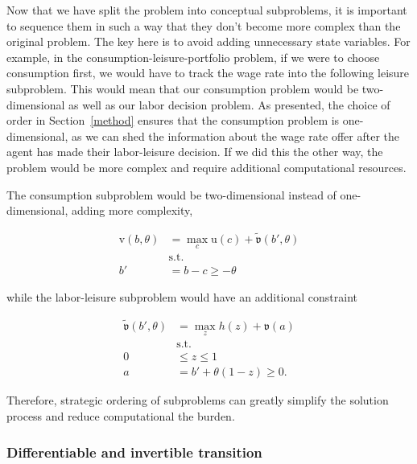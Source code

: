 \documentclass{article}
\newcommand{\tShkEmp}{\theta}
\newcommand{\h}{h}
\newcommand{\bRat}{b}
\newcommand{\leisure}{z}
\newcommand{\cRat}{c}
\newcommand{\vFunc}{\mathrm{v}}
\newcommand{\aRat}{a}
\newcommand{\vOpt}{\tilde{\mathfrak{v}}}
\newcommand{\vEnd}{\mathfrak{v}}
\newcommand{\uFunc}{\mathrm{u}}
\begin{document}

Now that we have split the problem into conceptual subproblems, it is important to sequence them in such a way that they don't become more complex than the original problem. The key here is to avoid adding unnecessary state variables. For example, in the consumption-leisure-portfolio problem, if we were to choose consumption first, we would have to track the wage rate into the following leisure subproblem. This would mean that our consumption problem would be two-dimensional as well as our labor decision problem. As presented, the choice of order in Section~\ref{method} ensures that the consumption problem is one-dimensional, as we can shed the information about the wage rate offer after the agent has made their labor-leisure decision. If we did this the other way, the problem would be more complex and require additional computational resources.

The consumption subproblem would be two-dimensional instead of one-dimensional, adding more complexity,

\begin{equation}
\begin{split}
        \vFunc(\bRat, \tShkEmp) & = \max_{\cRat} \uFunc(\cRat) + \vOpt(\bRat', \tShkEmp) \\
        & \text{s.t.}\\
        \bRat' & = \bRat - \cRat \ge - \tShkEmp
    \end{split}
\end{equation}

while the labor-leisure subproblem would have an additional constraint

\begin{equation}
\begin{split}
        \vOpt(\bRat', \tShkEmp) & = \max_{\leisure} \h(\leisure) + \vEnd(\aRat) \\
        & \text{s.t.} \\
        0 & \le \leisure \le 1 \\
        \aRat & = \bRat' + \tShkEmp(1 - \leisure) \ge 0.
    \end{split}
\end{equation}

Therefore, strategic ordering of subproblems can greatly simplify the solution process and reduce computational the burden.

\subsubsection{Differentiable and invertible transition}\label{Differentiable and invertible transition}
\end{document}

